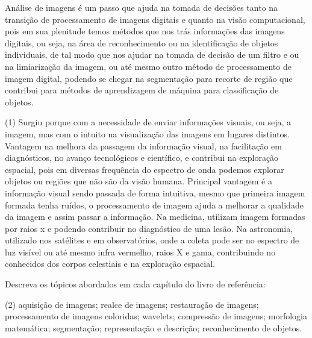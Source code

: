 \documentclass[12pt,a4paper]{article}
\begin{document}
\begin{solution}
    Análise de imagens é um passo que ajuda na tomada de decisões tanto na
    transição de processamento de imagens digitais e quanto na visão
    computacional, pois em sua plenitude temos métodos que nos trás informações
    das imagens digitais, ou seja, na área de reconhecimento ou na
    identificação de objetos individuais, de tal modo que nos ajudar na tomada
    de decisão de um filtro e ou na limiarização da imagem, ou até mesmo outro
    método de processamento de imagem digital, podendo se chegar na segmentação
    para recorte de região que contribui para métodos de aprendizagem de máquina
    para classificação de objetos. 
    \begin{tasks}(1)
        \task Surgiu porque com a necessidade de enviar informações visuais, ou
        seja, a imagem, mas com o intuito na visualização das imagens em lugares
        distintos.
        \task Vantagem na melhora da passagem da informação visual, na
        facilitação em diagnósticos, no avanço tecnológicos e científico, e
        contribui na exploração espacial, pois em diversas frequência do
        espectro de onda podemos explorar objetos ou regiões que não são da
        visão humana. Principal vantagem é a informação visual sendo passada de
        forma intuitiva, mesmo que primeira imagem formada tenha ruídos, o
        processamento de imagem ajuda a melhorar a qualidade da imagem e assim
        passar a informação.
        \task Na medicina, utilizam imagem formadas por raios x e podendo
        contribuir no diagnóstico de uma lesão. Na astronomia, utilizado nos
        satélites e em observatórios, onde a coleta pode ser no espectro de luz
        visível ou até mesmo infra vermelho, raios X e gama, contribuindo no
        conhecidos dos corpos celestiais e na exploração espacial.
    \end{tasks}
\end{solution}


\begin{question}{0.33}
    Descreva os tópicos abordados em cada capítulo do livro de referência:
    \begin{tasks}(2)
        \task aquisição de imagens;
        \task realce de imagens;
        \task restauração de imagens;
        \task processamento de imagens coloridas;
        \task wavelets;
        \task compressão de imagens;
        \task morfologia matemática;
        \task segmentação;
        \task representação e descrição;
        \task reconhecimento de objetos.
    \end{tasks}
\end{question}
\end{document}

